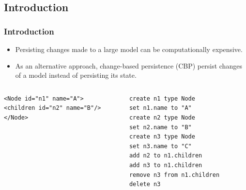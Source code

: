 \documentclass{beamer}
\begin{document}
\begin{frame}[fragile]
\section{Introduction}
\frametitle{Introduction}
\begin{itemize}
    \item Persisting changes made to a large model can be computationally expensive. 
    \item As an alternative approach, change-based persistence (CBP) persist changes of a model instead of persisting its state.
\end{itemize}

\begin{columns}
\begin{column}[t]{0.51\linewidth}
\begin{lstlisting}[style=xmi,caption={The tree model persisted in a state-based format (XMI).},label=lst:xmimodel]
<Node id="n1" name="A">
<children id="n2" name="B"/>
</Node>
\end{lstlisting}
\end{column}
\begin{column}[t]{0.49\linewidth}
\begin{lstlisting}[style=eol,caption={The tree model persisted in a change-based format.},label=lst:cbpmodel]
create n1 type Node
set n1.name to "A"  
create n2 type Node
set n2.name to "B"  
create n3 type Node
set n3.name to "C"  
add n2 to n1.children   
add n3 to n1.children
remove n3 from n1.children   
delete n3
\end{lstlisting}
\end{column}
\end{columns}

\end{frame}
\end{document}
